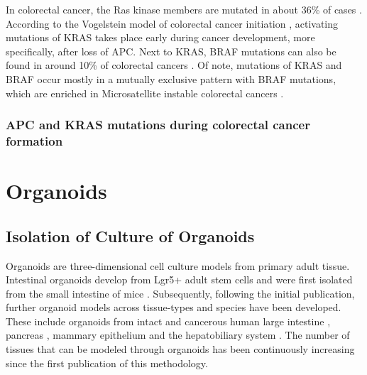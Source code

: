 \begin{flushleft}
In colorectal cancer, the Ras kinase members are mutated in about 36\% of cases \cite{Oncol2005}. According to the Vogelstein model of colorectal cancer initiation \cite{Fearon1989}, activating mutations of KRAS takes place early during cancer development, more specifically, after loss of APC.
Next to KRAS, BRAF mutations can also be found in around 10\% of colorectal cancers \cite{Oncol2005}. Of note, mutations of KRAS and BRAF occur mostly in a mutually exclusive pattern with BRAF mutations, which are enriched in Microsatellite instable colorectal cancers \cite{Oncol2005, Sahin2013}. 

\subsubsection{APC and KRAS mutations during colorectal cancer formation}


\section{Organoids}

\subsection{Isolation of Culture of Organoids}

Organoids are three-dimensional cell culture models from primary adult tissue. Intestinal organoids develop from Lgr5+ adult stem cells and were first isolated from the small intestine of mice \cite{Sato2011}. Subsequently, following the initial publication, further organoid models across tissue-types and species have been developed. These include organoids from intact and cancerous human large intestine \cite{Sato2011}, pancreas \cite{Sachs2017}, mammary epithelium \cite{Zhang2016EstablishingCells, Sachs2017AHeterogeneity} and the hepatobiliary system \cite{Huch2013NIHAccess, Broutier2016CultureManipulation.}. The number of tissues that can be modeled through organoids has been continuously increasing since the first publication of this methodology. \par


\end{flushleft}
